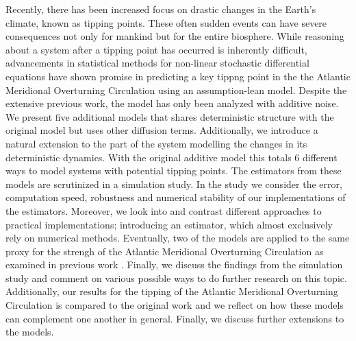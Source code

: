 \noindent Recently, there has been increased focus on drastic changes in the Earth's climate, known as tipping points. These often sudden events can have severe consequences not only for mankind but for the entire biosphere. While reasoning about a system after a tipping point has occurred is inherently difficult, advancements in statistical methods for non-linear stochastic differential equations \cite{SplittingSchemes} have shown promise in predicting a key tippng point in the the Atlantic Meridional Overturning Circulation \cite{Ditlevsen2023} using an assumption-lean model. Despite the extensive previous work, the model has only been analyzed with additive noise. We present five additional models that shares deterministic structure with the original model but uses other diffusion terms. Additionally, we introduce a natural extension to the part of the system modelling the changes in its deterministic dynamics. With the original additive model this totals 6 different ways to model systems with potential tipping points. The estimators from these models are scrutinized in a simulation study. In the study we consider the error, computation speed, robustness and numerical stability of our implementations of the estimators. Moreover, we look into and contrast different approaches to practical implementations; introducing an estimator, which almost exclusively rely on numerical methods. Eventually, two of the models are applied to the same proxy for the strengh of the Atlantic Meridional Overturning Circulation as examined in previous work \cite{Ditlevsen2023}. Finally, we discuss the findings from the simulation study and comment on various possible ways to do further research on this topic. Additionally, our results for the tipping of the Atlantic Meridional Overturning Circulation is compared to the original work and we reflect on how these models can complement one another in general. Finally, we discuss further extensions to the models.